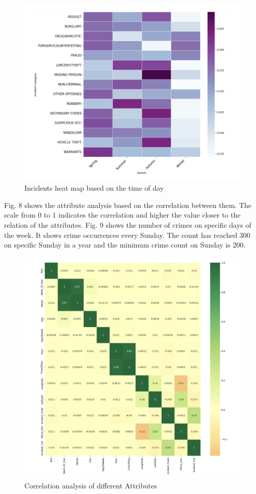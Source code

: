 \documentclass[10 pt,conference,final,]{IEEEtran}
\begin{document}
\begin{figure}

{\centering \includegraphics[width=0.9\linewidth]{img/fig7} 

}

\caption{Incidents heat map based on the time of day}\label{fig:unnamed-chunk-7}
\end{figure}

Fig. 8 shows the attribute analysis based on the correlation between
them. The scale from 0 to 1 indicates the correlation and higher the
value closer to the relation of the attributes. Fig. 9 shows the number
of crimes on specific days of the week. It shows crime occurrences every
Sunday. The count has reached 300 on specific Sunday in a year and the
minimum crime count on Sunday is 200.

\begin{figure}

{\centering \includegraphics[width=0.9\linewidth]{img/fig8} 

}

\caption{Correlation analysis of different Attributes}\label{fig:unnamed-chunk-8}
\end{figure}
\end{document}
